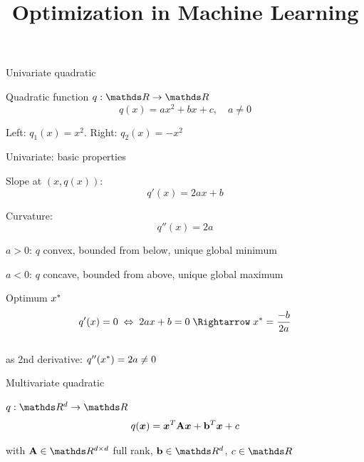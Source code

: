 \documentclass[11pt,compress,t,notes=noshow, xcolor=table]{beamer}
\title{Optimization in Machine Learning}
\begin{document}

\begin{framei}{Univariate quadratic}
\item Quadratic function $q: \R \to \R$
$$ q(x) = a x^2 + b x + c,\quad a \ne 0 $$
\item Left: $q_1(x) = x^2$. Right: $q_2(x) = - x^2$
\end{framei}


\begin{framei}{Univariate: basic properties}
\item Slope at $(x, q(x))$: $$ q'(x) = 2 a x + b $$
\item Curvature: $$ q''(x) = 2 a $$
\item $a > 0$: $q$ convex, bounded from below, unique global minimum
\item $a < 0$: $q$ concave, bounded from above, unique global maximum
\item Optimum $x^\ast$
$$ q'(x) = 0 \;\Leftrightarrow\; 2 a x + b = 0 \;\Rightarrow\; \xs = \frac{-b}{2 a} $$\\
as 2nd derivative: $q''(x^\ast) = 2 a \ne 0$ 
\end{framei}
  

\begin{framei}{Multivariate quadratic}
\item $q: \R^d \to \R$
$$ q(\bm{x}) = \bm{x}^T \mathbf{A} \bm{x} + \mathbf{b}^T \bm{x} + c $$
\item with $\A \in \R^{d \times d}$ full rank, $\bv \in \R^d$, $c \in \R$
\vfill
{}
\end{framei}
\end{document}
